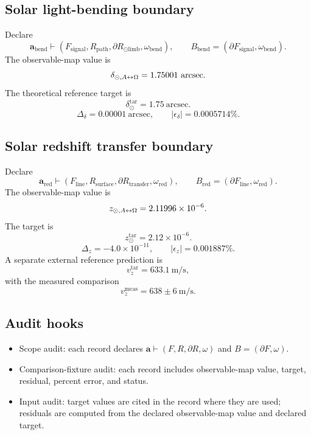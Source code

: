 
\subsection{Solar light-bending boundary}\label{manual:solar:light-bending}
Declare
\[
\mathbf a_{\mathrm{bend}}\vdash(F_{\mathrm{signal}},R_{\mathrm{path}},\partial R_{\odot\mathrm{limb}},\omega_{\mathrm{bend}}),
\qquad
B_{\mathrm{bend}}=(\partial F_{\mathrm{signal}},\omega_{\mathrm{bend}}).
\]
The observable-map value is
\[
\delta_{\odot,\AO}=1.75001\ \mathrm{arcsec}.
\]
The theoretical reference target is
\[
\delta_{\odot}^{\mathrm{tar}}=1.75\ \mathrm{arcsec}.
\]
\[
\Delta_\delta=0.00001\ \mathrm{arcsec},
\qquad
|\epsilon_\delta|=0.0005714\%.
\]


\subsection{Solar redshift transfer boundary}\label{manual:solar:redshift}
Declare
\[
\mathbf a_{\mathrm{red}}
\vdash(F_{\mathrm{line}},R_{\mathrm{surface}},\partial R_{\mathrm{transfer}},\omega_{\mathrm{red}}),
\qquad
B_{\mathrm{red}}=(\partial F_{\mathrm{line}},\omega_{\mathrm{red}}).
\]
The observable-map value is
\[
z_{\odot,A{\leftrightarrow}\Omega}=2.11996\times10^{-6}.
\]
The target is
\[
z_{\odot}^{\mathrm{tar}}=2.12\times10^{-6}.
\]
\[
\Delta_z=-4.0\times10^{-11},
\qquad
|\epsilon_z|=0.001887\%.
\]
A separate external reference prediction is
\[
v_z^{\mathrm{tar}}=633.1\ \mathrm{m/s},
\]
with the measured comparison
\[
v_z^{\mathrm{meas}}=638\pm6\ \mathrm{m/s}.
\]


\subsection{Audit hooks}\label{manual:solar:audit-hooks}
\begin{itemize}
\item Scope audit: each record declares \(\mathbf a\vdash(F,R,\partial R,\omega)\) and \(B=(\partial F,\omega)\).
\item Comparison-fixture audit: each record includes observable-map value, target, residual, percent error, and status.
\item Input audit: target values are cited in the record where they are used; residuals are computed from the declared observable-map value and declared target.
\end{itemize}

